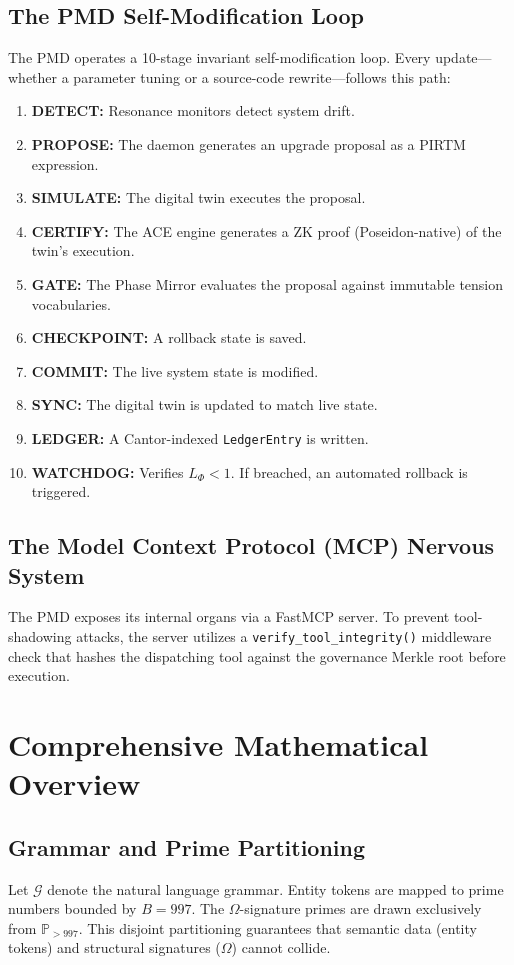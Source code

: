 \documentclass[11pt]{article}
\begin{document}
\section{The PMD Self-Modification Loop}
The PMD operates a 10-stage invariant self-modification loop. Every update—whether a parameter tuning or a source-code rewrite—follows this path:
\begin{enumerate}
    \item \textbf{DETECT:} Resonance monitors detect system drift.
    \item \textbf{PROPOSE:} The daemon generates an upgrade proposal as a PIRTM expression.
    \item \textbf{SIMULATE:} The digital twin executes the proposal.
    \item \textbf{CERTIFY:} The ACE engine generates a ZK proof (Poseidon-native) of the twin's execution.
    \item \textbf{GATE:} The Phase Mirror evaluates the proposal against immutable tension vocabularies.
    \item \textbf{CHECKPOINT:} A rollback state is saved.
    \item \textbf{COMMIT:} The live system state is modified.
    \item \textbf{SYNC:} The digital twin is updated to match live state.
    \item \textbf{LEDGER:} A Cantor-indexed \texttt{LedgerEntry} is written.
    \item \textbf{WATCHDOG:} Verifies \(L_\Phi < 1\). If breached, an automated rollback is triggered.
\end{enumerate}

\section{The Model Context Protocol (MCP) Nervous System}
The PMD exposes its internal organs via a FastMCP server. To prevent tool-shadowing attacks, the server utilizes a \texttt{verify\_tool\_integrity()} middleware check that hashes the dispatching tool against the governance Merkle root before execution.

\chapter{Comprehensive Mathematical Overview}

\section{Grammar and Prime Partitioning}
Let \(\mathcal{G}\) denote the natural language grammar. Entity tokens are mapped to prime numbers bounded by \(B = 997\). The \(\Omega\)-signature primes are drawn exclusively from \(\mathbb{P}_{> 997}\). This disjoint partitioning guarantees that semantic data (entity tokens) and structural signatures (\(\Omega\)) cannot collide.
\end{document}
